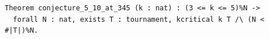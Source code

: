 \begin{lstlisting}[language=Rocq]
Theorem conjecture_5_10_at_345 (k : nat) : (3 <= k <= 5)%N ->
  forall N : nat, exists T : tournament, kcritical k T /\ (N < #|T|)%N.
\end{lstlisting}
